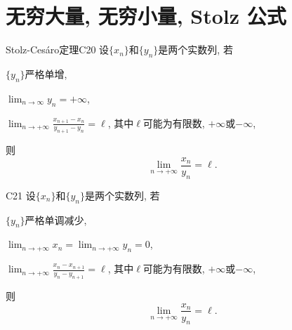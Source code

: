 \section{无穷大量, 无穷小量, Stolz 公式}
\begin{theorem}{Stolz-Ces\'{a}ro定理}{C20}
  设\(\{x_n\}\)和\(\{y_n\}\)是两个实数列, 若\begin{compactenum}[(i)]
    \item \(\{y_n\}\)严格单增,
    \item \( \lim_{n\rightarrow\infty}y_n=+\infty\),
    \item \( \lim_{n\rightarrow+\infty}\frac{x_{n+1}-x_n}{y_{n+1}-y_n}=\ell\), 其中\(\ell \)可能为有限数, \(+\infty\)或\(-\infty\),   
  \end{compactenum}则\[\lim_{n\rightarrow+\infty}\frac{x_n}{y_n}=\ell.\]  
\end{theorem}
\begin{theorem}{}{C21}
  设\(\{x_n\}\)和\(\{y_n\}\)是两个实数列, 若\begin{compactenum}[(i)]
    \item \(\{y_n\}\)严格单调减少,
    \item \( \lim_{n\rightarrow+\infty}x_n=\lim_{n\rightarrow+\infty}y_n=0\),
    \item \( \lim_{n\rightarrow+\infty}\frac{x_n-x_{n+1}}{y_{n}-y_{n+1}}=\ell\), 其中\(\ell \)可能为有限数, \(+\infty\)或\(-\infty\),   
  \end{compactenum}则\[\lim_{n\rightarrow+\infty}\frac{x_n}{y_n}=\ell.\]  
\end{theorem}
